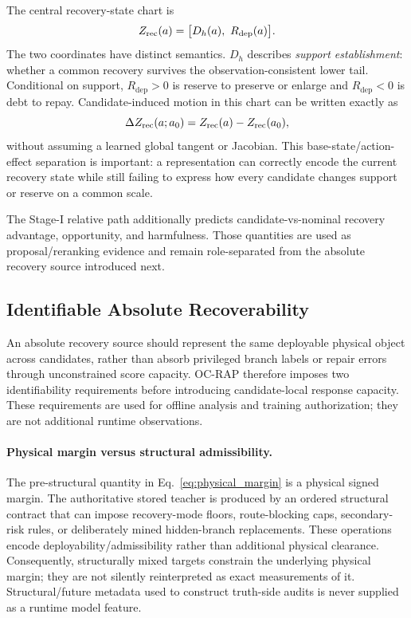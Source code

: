 \documentclass{article} %
\newcommand{\Rdep}{R_{\mathrm{dep}}}
\begin{document}
The central recovery-state chart is
\begin{equation}
 Z_{\rm rec}(a)=\big[D_h(a),\ \Rdep(a)\big].
 \label{eq:recovery_state_chart}
\end{equation}
The two coordinates have distinct semantics. $D_h$ describes \emph{support establishment}: whether a common recovery survives the observation-consistent lower tail. Conditional on support, $\Rdep>0$ is reserve to preserve or enlarge and $\Rdep<0$ is debt to repay. Candidate-induced motion in this chart can be written exactly as
\begin{equation}
 \Delta Z_{\rm rec}(a;a_0)=Z_{\rm rec}(a)-Z_{\rm rec}(a_0),
 \label{eq:recovery_state_delta}
\end{equation}
without assuming a learned global tangent or Jacobian. This base-state/action-effect separation is important: a representation can correctly encode the current recovery state while still failing to express how every candidate changes support or reserve on a common scale.

The Stage-I relative path additionally predicts candidate-vs-nominal recovery advantage, opportunity, and harmfulness. Those quantities are used as proposal/reranking evidence and remain role-separated from the absolute recovery source introduced next.

\subsection{Identifiable Absolute Recoverability}
\label{subsec:identifiable_source}

An absolute recovery source should represent the same deployable physical object across candidates, rather than absorb privileged branch labels or repair errors through unconstrained score capacity. OC-RAP therefore imposes two identifiability requirements before introducing candidate-local response capacity. These requirements are used for offline analysis and training authorization; they are not additional runtime observations.

\paragraph{Physical margin versus structural admissibility.}
The pre-structural quantity in Eq.~\eqref{eq:physical_margin} is a physical signed margin. The authoritative stored teacher is produced by an ordered structural contract that can impose recovery-mode floors, route-blocking caps, secondary-risk rules, or deliberately mined hidden-branch replacements. These operations encode deployability/admissibility rather than additional physical clearance. Consequently, structurally mixed targets constrain the underlying physical margin; they are not silently reinterpreted as exact measurements of it. Structural/future metadata used to construct truth-side audits is never supplied as a runtime model feature.
\end{document}
